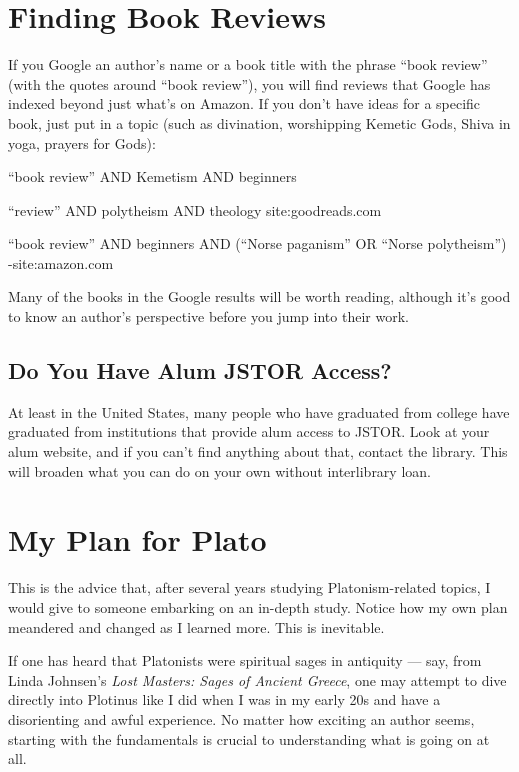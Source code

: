 \documentclass[
]{book}
\begin{document}
\hypertarget{finding-book-reviews}{%
\section{Finding Book Reviews}\label{finding-book-reviews}}

If you Google an author's name or a book title with the phrase ``book review'' (with the quotes around ``book review''), you will find reviews that Google has indexed beyond just what's on Amazon. If you don't have ideas for a specific book, just put in a topic (such as divination, worshipping Kemetic Gods, Shiva in yoga, prayers for Gods):

``book review'' AND Kemetism AND beginners

``review'' AND polytheism AND theology site:goodreads.com

``book review'' AND beginners AND (``Norse paganism'' OR ``Norse polytheism'') -site:amazon.com

Many of the books in the Google results will be worth reading, although it's good to know an author's perspective before you jump into their work.

\hypertarget{do-you-have-alum-jstor-access}{%
\subsection{Do You Have Alum JSTOR Access?}\label{do-you-have-alum-jstor-access}}

At least in the United States, many people who have graduated from college have graduated from institutions that provide alum access to JSTOR. Look at your alum website, and if you can't find anything about that, contact the library. This will broaden what you can do on your own without interlibrary loan.

\hypertarget{my-plan-for-plato}{%
\section{My Plan for Plato}\label{my-plan-for-plato}}

This is the advice that, after several years studying Platonism-related topics, I would give to someone embarking on an in-depth study. Notice how my own plan meandered and changed as I learned more. This is inevitable.

If one has heard that Platonists were spiritual sages in antiquity --- say, from Linda Johnsen's \emph{Lost Masters: Sages of Ancient Greece}, one may attempt to dive directly into Plotinus like I did when I was in my early 20s and have a disorienting and awful experience. No matter how exciting an author seems, starting with the fundamentals is crucial to understanding what is going on at all.
\end{document}
